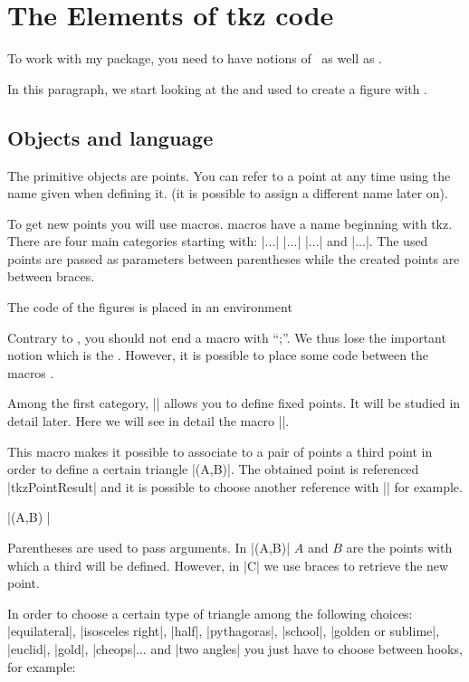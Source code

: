 \section{The Elements of tkz code}

To work with my package, you need to have notions of \LATEX\ as well as \TIKZ.

In this paragraph, we start looking at the  and  used to create a figure with \tkzname{\tkznameofpack}.

\subsection{Objects and language}

 The primitive objects are points. You can refer to a point at any time using the name given when defining it. (it is possible to assign a different name later on).

To get new points you will use macros. \tkzname{\tkznameofpack} macros have a name beginning with tkz. There are four main categories starting with:
|\tkzDef...| |\tkzDraw...| |\tkzMark...| and |\tkzLabel...|. 
The used points are passed as parameters between parentheses while the created points are between braces.

The code of the figures is placed in an environment 


Contrary to \TIKZ, you should not end a macro with  “;”. We thus lose the important notion which is the . However, it is possible to place some code between the macros \tkzname{\tkznameofpack}.
 

Among the first category, |\tkzDefPoint| allows you to define fixed points. It will be studied in detail later. Here we will see in detail the macro  |\tkzDefTriangle|.

This macro makes it possible to associate to a pair of points a third point in order to define a certain triangle |\tkzDefTriangle(A,B)|. The obtained point is referenced |tkzPointResult| and it is possible to choose another reference with || for example.

|\tkzDefTriangle[euclid](A,B) |

Parentheses are used to pass arguments. In |(A,B)| $A$ and $B$ are the points with which a third will be defined. However, in |{C}| we use braces to retrieve the new point.

In order to choose a certain type of triangle among the following choices:
  |equilateral|,  |isosceles right|, |half|, |pythagoras|, |school|, |golden or sublime|, |euclid|, |gold|, |cheops|...
 and |two angles| you just have to choose between hooks, for example:
 
